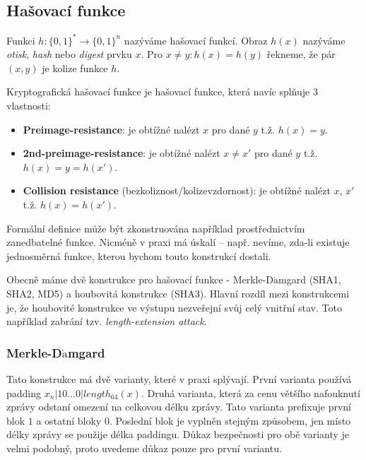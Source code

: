 \subsection*{Hašovací funkce}
\begin{defn}
	Funkci $h:\{0,1\}^*\rightarrow\{0,1\}^n$ nazýváme hašovací funkcí. Obraz $h(x)$ nazýváme \textit{otisk}, \textit{hash} nebo \textit{digest} prvku $x$. Pro $x\neq y:h(x)=h(y)$ řekneme, že pár $(x,y)$ je kolize funkce $h$.
\end{defn}

\begin{defn}
	Kryptografická hašovací funkce je hašovací funkce, která navíc splňuje 3 vlastnosti:
	\begin{itemize}
		\item \textbf{Preimage-resistance}: je obtížné nalézt $x$ pro dané $y$ t.ž. $h(x)=y$.
		\item \textbf{2nd-preimage-resistance}: je obtížné nalézt $x\neq x'$ pro dané $y$ t.ž. $h(x)=y=h(x')$.
		\item \textbf{Collision resistance} (bezkoliznost/kolizevzdornost): je obtížné nalézt $x,\,x'$ t.ž. $h(x)=h(x')$.
	\end{itemize}
\end{defn}

Formální definice může být zkonstruována například prostřednictvím zanedbatelné funkce. Nicméně v praxi má úskalí -- např. nevíme, zda-li existuje jednosměrná funkce, kterou bychom touto konstrukcí dostali.

Obecně máme dvě konstrukce pro hašovací funkce - Merkle-D$\mathring{\text{a}}$mgard (SHA1, SHA2, MD5) a houbovitá konstrukce (SHA3). Hlavní rozdíl mezi konstrukcemi je, že houbovité konstrukce ve výstupu nezveřejní svůj celý vnitřní stav. Toto například zabrání tzv. \textit{length-extension attack}.

\subsubsection*{Merkle-D$\mathring{\text{a}}$mgard}
Tato konstrukce má dvě varianty, které v praxi splývají. První varianta používá padding $x_n|10...0|length_{64}(x)$. Druhá varianta, která za cenu většího nafouknutí zprávy odstaní omezení na celkovou délku zprávy. Tato varianta prefixuje první blok $1$ a ostatní bloky $0$. Poslední blok je vyplněn stejným způsobem, jen místo délky zprávy se použije délka paddingu. Důkaz bezpečnosti pro obě varianty je velmi podobný, proto uvedeme důkaz pouze pro první variantu.


